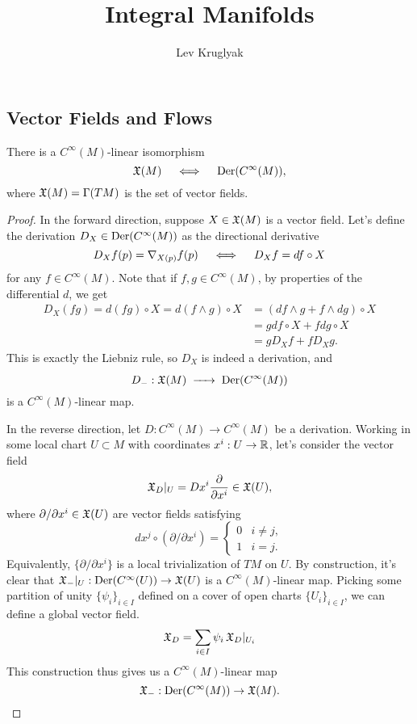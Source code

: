 \documentclass{lkx_paper}
\title{\textbf{Integral Manifolds}}
\date{}
\author{Lev Kruglyak}
\begin{document}
\maketitle

\subsection*{Vector Fields and Flows}

\begin{proposition*}
	There is a $C^\infty(M)$-linear isomorphism
	\[
		\mathfrak{X}(M) \quad\iff\quad \mathrm{Der}(C^\infty(M)),
	\]
	where $\mathfrak{X}(M)=\Gamma(TM)$ is the set of vector fields.
\end{proposition*}

\begin{proof}
	In the forward direction, suppose $X\in \mathfrak{X}(M)$ is a vector field. Let's define the derivation $D_X\in \mathrm{Der}(C^\infty(M))$ as the directional derivative
	\[
		D_X f(p) = \nabla_{X(p)} f(p) \quad\iff\quad D_X f = df\circ X
	\]
	for any $f\in C^\infty(M)$. Note that if $f,g\in C^\infty(M)$, by properties of the differential $d$, we get
	\[
		\begin{aligned}
			D_X (f g) = d(f g)\circ X = d(f\wedge g) \circ X
			 & = (df\wedge g + f\wedge dg)\circ X \\
			 & = g df \circ X + f dg\circ X       \\
			 & = g D_X f + f D_X g.
		\end{aligned}
	\]
	This is exactly the Liebniz rule, so $D_X$ is indeed a derivation, and
	\[
		D_- : \X(M) \longto \Der(C^\infty(M))
	\]
	is a $C^\infty(M)$-linear map.

	In the reverse direction, let $D : C^\infty(M) \to C^\infty(M)$ be a derivation. Working in some local chart $U\subset M$ with coordinates $x^i : U \to \mathbb{R}$, let's consider the vector field
	\[
		\mathfrak{X}_{D}|_U = D x^i  \frac{\partial}{\partial x^i}\in \mathfrak{X}(U),
	\]
	where $\partial/\partial x^i \in \mathfrak{X}(U)$ are vector fields satisfying
	\[dx^j \circ (\partial / \partial x^i) = \begin{cases}0 & i\neq j,\\ 1 & i = j.\end{cases}\]
	Equivalently, $\{\partial/\partial x^i\}$ is a local trivialization of $TM$ on $U$. By construction, it's clear that $\mathfrak{X}_{-}|_U : \mathrm{Der}(C^\infty(U)) \to \mathfrak{X}(U)$ is a $C^\infty(M)$-linear map. Picking some partition of unity $\{\psi_i\}_{i\in I}$ defined on a cover of open charts $\{U_i\}_{i\in I}$, we can define a global vector field.
	\[
		\mathfrak{X}_D = \sum_{i\in I}\psi_i\, \mathfrak{X}_{D}|_{U_i}
	\]
	This construction thus gives us a $C^\infty(M)$-linear map
	\[
		\mathfrak{X}_- : \mathrm{Der}(C^\infty(M)) \to \mathfrak{X}(M).
	\]


\end{proof}
\end{document}
